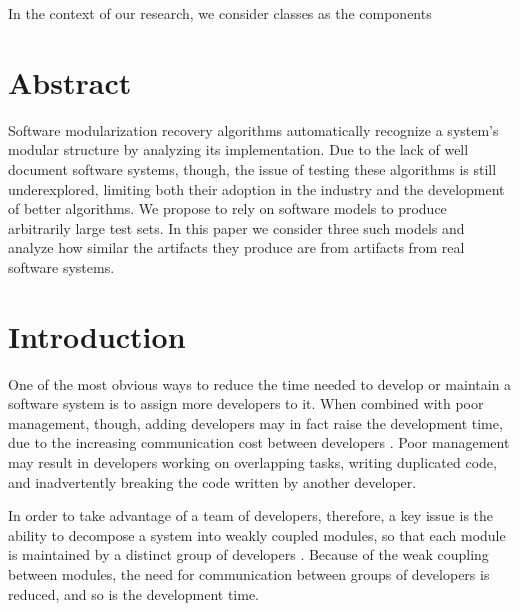 In the context of our research, we consider classes as the components

\section{Abstract}

Software modularization recovery algorithms automatically recognize a system's
modular structure by analyzing its implementation.
Due to the lack of well document software systems, though, the issue of testing
these algorithms is still underexplored, limiting both their adoption in the
industry and the development of better algorithms.
We propose to rely on software models to produce arbitrarily large test sets. In
this paper we consider three such models and analyze how similar the artifacts
they produce are from artifacts from real software systems.

\section{Introduction}

%

One of the most obvious ways to reduce the time needed to develop or maintain a
software system is to assign more developers to it. When combined with poor
management, though, adding developers may in fact raise the development time,
due to the increasing communication cost between developers \cite{Brooks1995}.
Poor management may result in developers working on overlapping tasks, writing
duplicated code, and inadvertently breaking the code written by another
developer.


In order to take advantage of a team of developers, therefore, a key issue is
the ability to decompose a system into weakly coupled modules, so that each
module is maintained by a distinct group of developers \cite{Parnas1972}.
Because of the weak coupling between modules, the need for communication between
groups of developers is reduced, and so is the development time.
 
